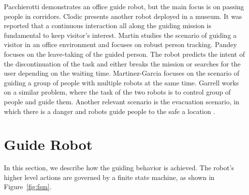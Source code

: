 Pacchierotti \cite{pacchierotti2006design} demonstrates an office guide robot, but the main focus is on passing people in corridors. Clodic \cite{clodic2006rackham} presents another robot deployed in a museum. It was reported that a continuous interaction all along the guiding mission is fundamental to keep visitor's interest. Martin \cite{martin2004conception} studies the scenario of guiding a visitor in an office environment and focuses on robust person tracking. Pandey \cite{pandey2009step} focuses on the leave-taking of the guided person. The robot predicts the intent of the discontinuation of the task and either breaks the mission or searches for the user depending on the waiting time. Martinez-Garcia \cite{martinez2005crowding} focuses on the scenario of guiding a group of people with multiple robots at the same time. Garrell \cite{garrell2010local} works on a similar problem, where the task of the two robots is to control group of people and guide them. Another relevant scenario is the evacuation scenario, in which there is a danger and robots guide people to the safe a location \cite{kim2009portable,robinette2011incorporating}.

\section{Guide Robot}
\label{sec:guidance_guide_robot}

In this section, we describe how the guiding behavior is achieved. The robot's higher level actions are governed by a finite state machine, as shown in Figure~\ref{fig:fsm}. 


